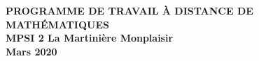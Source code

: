 \documentclass[12pt,a4paper]{article}
\begin{document}
\begin{center}
\Large\bf PROGRAMME DE TRAVAIL À DISTANCE DE MATHÉMATIQUES\\
MPSI 2 La Martinière Monplaisir\\ Mars 2020
\end{center}
\vspace{1cm}
\vspace{.4cm}

% 
% 
% 
% 
% 
% 
% 
% 
% 

% 
%
\end{document}
